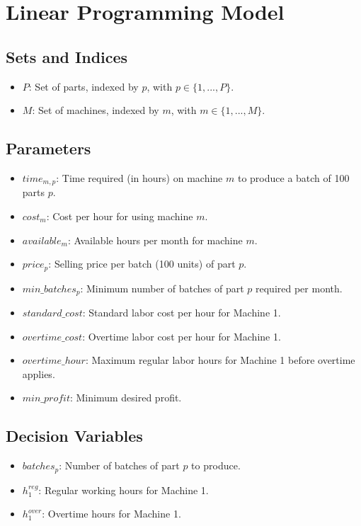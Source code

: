 \documentclass{article}
\begin{document}
\section*{Linear Programming Model}

\subsection*{Sets and Indices}
\begin{itemize}
    \item $P$: Set of parts, indexed by $p$, with $p \in \{1, ..., P\}$.
    \item $M$: Set of machines, indexed by $m$, with $m \in \{1, ..., M\}$.
\end{itemize}

\subsection*{Parameters}
\begin{itemize}
    \item $time_{m,p}$: Time required (in hours) on machine $m$ to produce a batch of 100 parts $p$.
    \item $cost_{m}$: Cost per hour for using machine $m$.
    \item $available_{m}$: Available hours per month for machine $m$.
    \item $price_{p}$: Selling price per batch (100 units) of part $p$.
    \item $min\_batches_{p}$: Minimum number of batches of part $p$ required per month.
    \item $standard\_cost$: Standard labor cost per hour for Machine 1.
    \item $overtime\_cost$: Overtime labor cost per hour for Machine 1.
    \item $overtime\_hour$: Maximum regular labor hours for Machine 1 before overtime applies.
    \item $min\_profit$: Minimum desired profit.
\end{itemize}

\subsection*{Decision Variables}
\begin{itemize}
    \item $batches_{p}$: Number of batches of part $p$ to produce.
    \item $h_{1}^{reg}$: Regular working hours for Machine 1.
    \item $h_{1}^{over}$: Overtime hours for Machine 1.
\end{itemize}
\end{document}

